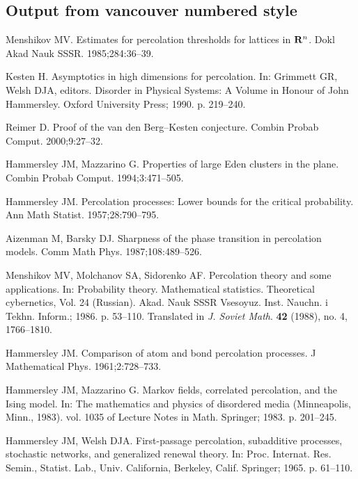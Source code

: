 \subsection*{Output from vancouver numbered style}
\begin{vancouveroutput}{10}

Menshikov MV.
\newblock Estimates for percolation thresholds for lattices in {${\bf R}\sp
  n$}.
\newblock Dokl Akad Nauk SSSR. 1985;284:36--39.

Kesten H.
\newblock Asymptotics in high dimensions for percolation.
\newblock In: Grimmett GR, Welsh DJA, editors. Disorder in Physical Systems: A
  Volume in Honour of John Hammersley. Oxford University Press; 1990. p.
  219--240.

Reimer D.
\newblock Proof of the van den {B}erg--{K}esten conjecture.
\newblock Combin Probab Comput. 2000;9:27--32.

Hammersley JM, Mazzarino G.
\newblock Properties of large {E}den clusters in the plane.
\newblock Combin Probab Comput. 1994;3:471--505.

Hammersley JM.
\newblock Percolation processes: {L}ower bounds for the critical probability.
\newblock Ann Math Statist. 1957;28:790--795.

Aizenman M, Barsky DJ.
\newblock Sharpness of the phase transition in percolation models.
\newblock Comm Math Phys. 1987;108:489--526.

Menshikov MV, Molchanov SA, Sidorenko AF.
\newblock Percolation theory and some applications.
\newblock In: Probability theory. Mathematical statistics. Theoretical
  cybernetics, Vol. 24 (Russian). Akad. Nauk SSSR Vsesoyuz. Inst. Nauchn. i
  Tekhn. Inform.; 1986. p. 53--110.
\newblock Translated in {\em J. Soviet Math}. {\bf 42} (1988), no. 4,
  1766--1810.

Hammersley JM.
\newblock Comparison of atom and bond percolation processes.
\newblock J Mathematical Phys. 1961;2:728--733.

Hammersley JM, Mazzarino G.
\newblock Markov fields, correlated percolation, and the {I}sing model.
\newblock In: The mathematics and physics of disordered media (Minneapolis,
  Minn., 1983). vol. 1035 of Lecture Notes in Math. Springer; 1983. p.
  201--245.

Hammersley JM, Welsh DJA.
\newblock First-passage percolation, subadditive processes, stochastic
  networks, and generalized renewal theory.
\newblock In: Proc. Internat. Res. Semin., Statist. Lab., Univ. California,
  Berkeley, Calif. Springer; 1965. p. 61--110.

\end{vancouveroutput}

